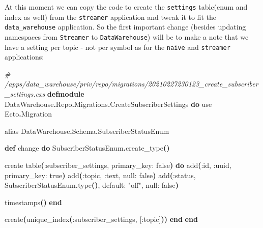 \documentclass[
  oneside]{book}
\newenvironment{Shaded}{\begin{snugshade}}{\end{snugshade}}
\newcommand{\CommentTok}[1]{\textcolor[rgb]{0.56,0.35,0.01}{\textit{#1}}}
\newcommand{\ConstantTok}[1]{\textcolor[rgb]{0.56,0.35,0.01}{#1}}
\newcommand{\FunctionTok}[1]{\textcolor[rgb]{0.13,0.29,0.53}{\textbf{#1}}}
\newcommand{\ImportTok}[1]{#1}
\newcommand{\KeywordTok}[1]{\textcolor[rgb]{0.13,0.29,0.53}{\textbf{#1}}}
\newcommand{\NormalTok}[1]{#1}
\newcommand{\OperatorTok}[1]{\textcolor[rgb]{0.81,0.36,0.00}{\textbf{#1}}}
\newcommand{\OtherTok}[1]{\textcolor[rgb]{0.56,0.35,0.01}{#1}}
\newcommand{\StringTok}[1]{\textcolor[rgb]{0.31,0.60,0.02}{#1}}
\newcommand{\VariableTok}[1]{\textcolor[rgb]{0.00,0.00,0.00}{#1}}
\begin{document}
\newpage

At this moment we can copy the code to create the \texttt{settings} table(enum and index as well) from the \texttt{streamer} application and tweak it to fit the \texttt{data\_warehouse} application. So the first important change (besides updating namespaces from \texttt{Streamer} to \texttt{DataWarehouse}) will be to make a note that we have a setting per topic - not per symbol as for the \texttt{naive} and \texttt{streamer} applications:

\begin{Shaded}
\begin{Highlighting}[]
\CommentTok{\# /apps/data\_warehouse/priv/repo/migrations/20210227230123\_create\_subscriber\_settings.exs}
\KeywordTok{defmodule} \ConstantTok{DataWarehouse}\OperatorTok{.}\ConstantTok{Repo}\OperatorTok{.}\ConstantTok{Migrations}\OperatorTok{.}\ConstantTok{CreateSubscriberSettings} \KeywordTok{do}
  \ImportTok{use} \ConstantTok{Ecto}\OperatorTok{.}\ConstantTok{Migration}

  \ImportTok{alias} \ConstantTok{DataWarehouse}\OperatorTok{.}\ConstantTok{Schema}\OperatorTok{.}\ConstantTok{SubscriberStatusEnum}

  \KeywordTok{def}\NormalTok{ change }\KeywordTok{do}
    \ConstantTok{SubscriberStatusEnum}\OperatorTok{.}\NormalTok{create\_type}\FunctionTok{()}

\NormalTok{    create table}\FunctionTok{(}\VariableTok{:subscriber\_settings}\NormalTok{, }\VariableTok{primary\_key:} \ConstantTok{false}\FunctionTok{)} \KeywordTok{do}
\NormalTok{      add}\FunctionTok{(}\VariableTok{:id}\NormalTok{, }\VariableTok{:uuid}\NormalTok{, }\VariableTok{primary\_key:} \ConstantTok{true}\FunctionTok{)}
\NormalTok{      add}\FunctionTok{(}\VariableTok{:topic}\NormalTok{, }\VariableTok{:text}\NormalTok{, }\VariableTok{null:} \ConstantTok{false}\FunctionTok{)}
\NormalTok{      add}\FunctionTok{(}\VariableTok{:status}\NormalTok{, }\ConstantTok{SubscriberStatusEnum}\OperatorTok{.}\NormalTok{type}\FunctionTok{()}\NormalTok{, }\VariableTok{default:} \StringTok{"off"}\NormalTok{, }\VariableTok{null:} \ConstantTok{false}\FunctionTok{)}
      
\NormalTok{      timestamps}\FunctionTok{()}
    \KeywordTok{end}

\NormalTok{    create}\FunctionTok{(}\NormalTok{unique\_index}\FunctionTok{(}\VariableTok{:subscriber\_settings}\NormalTok{, }\OtherTok{[}\VariableTok{:topic}\OtherTok{]}\FunctionTok{))}
  \KeywordTok{end}
\KeywordTok{end}
\end{Highlighting}
\end{Shaded}
\end{document}
